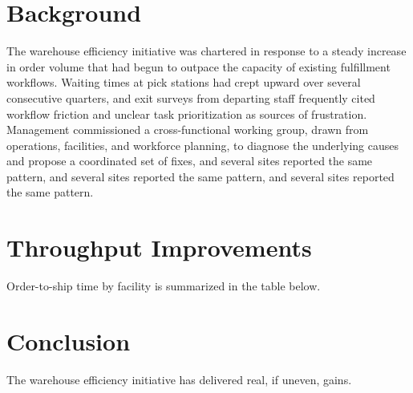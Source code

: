 \documentclass[11pt]{article}
\begin{document}
\section{Background}
The warehouse efficiency initiative was chartered in response to a steady
increase in order volume that had begun to outpace the capacity of existing
fulfillment workflows. Waiting times at pick stations had crept upward over
several consecutive quarters, and exit surveys from departing staff
frequently cited workflow friction and unclear task prioritization as
sources of frustration. Management commissioned a cross-functional working
group, drawn from operations, facilities, and workforce planning, to
diagnose the underlying causes and propose a coordinated set of fixes,
and several sites reported the same pattern, and several sites reported
the same pattern, and several sites reported the same pattern.

\section{Throughput Improvements}
Order-to-ship time by facility is summarized in the table below.

\begin{table}[h]
\centering
\caption{Median order-to-ship time by facility (hours).}
\end{table}

\section{Conclusion}
The warehouse efficiency initiative has delivered real, if uneven, gains.
\end{document}
